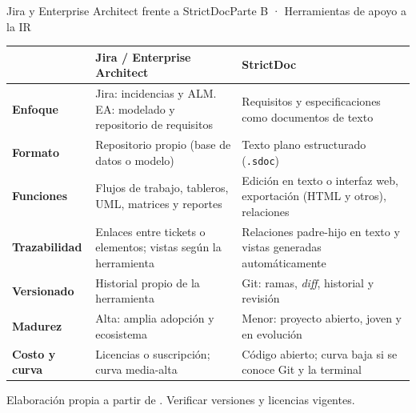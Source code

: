 \documentclass[aspectratio=169,11pt,t]{beamer}
\begin{document}
	\begin{frame}{Jira y Enterprise Architect frente a StrictDoc}{Parte B · Herramientas de apoyo a la IR}
		\scriptsize
		\renewcommand{\arraystretch}{1.12}
		\setlength{\tabcolsep}{4pt}
		\begin{tabular}{@{}p{2.1cm}p{5.1cm}p{5.4cm}@{}}
			\toprule
			& {\color{acento}\bfseries Jira / Enterprise Architect} & {\color{acento}\bfseries StrictDoc}\\
			\midrule
			{\bfseries Enfoque} & Jira: incidencias y ALM. EA: modelado y repositorio de requisitos & Requisitos y especificaciones como documentos de texto\\
			{\bfseries Formato} & Repositorio propio (base de datos o modelo) & Texto plano estructurado (\texttt{.sdoc})\\
			{\bfseries Funciones} & Flujos de trabajo, tableros, UML, matrices y reportes & Edición en texto o interfaz web, exportación (HTML y otros), relaciones\\
			{\bfseries Trazabilidad} & Enlaces entre tickets o elementos; vistas según la herramienta & Relaciones padre-hijo en texto y vistas generadas automáticamente\\
			{\bfseries Versionado} & Historial propio de la herramienta & Git: ramas, \emph{diff}, historial y revisión\\
			{\bfseries Madurez} & Alta: amplia adopción y ecosistema & Menor: proyecto abierto, joven y en evolución\\
			{\bfseries Costo y curva} & Licencias o suscripción; curva media-alta & Código abierto; curva baja si se conoce Git y la terminal\\
			\bottomrule
		\end{tabular}
		\vspace{2pt}\par
		{\color{gris}\tiny Elaboración propia a partir de \cite{wang2018,mucha2024,strictdocdocs}. Verificar versiones y licencias vigentes.}
	\end{frame}
	
\end{document}
